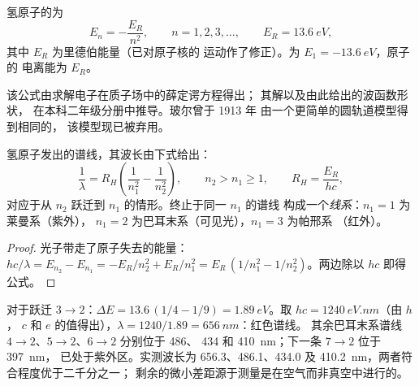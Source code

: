 \begin{theorem}[氢原子的能级]\label{thm:b1:quantum-numbers:levels}
氢原子的为
\[
  E_n = -\frac{E_R}{n^2}, \qquad n = 1, 2, 3, \dots,
  \qquad E_R = \qty{13.6}{eV},
\]
其中 $E_R$ 为里德伯能量（已对原子核的
运动作了修正）。为 $E_1 = \qty{-13.6}{eV}$，原子的
电离能为 $E_R$。
\end{theorem}
\admitted

\begin{remark}[公式的来源]\label{rem:b1:quantum-numbers:schrodinger}
该公式由求解电子在质子场中的薛定谔方程得出；
其解以及由此给出的波函数形状，
在本科二年级分册中推导。玻尔曾于 1913 年
由一个更简单的圆轨道模型得到相同的，
该模型现已被弃用。
\end{remark}

\begin{proposition}[里德伯公式]\label{prop:b1:quantum-numbers:rydberg}
氢原子发出的谱线，其波长由下式给出：
\[
  \frac{1}{\lambda} = R_H\left(\frac{1}{n_1^2} - \frac{1}{n_2^2}\right),
  \qquad n_2 > n_1 \ge 1, \qquad R_H = \frac{E_R}{hc},
\]
对应于从 $n_2$ 跃迁到 $n_1$ 的情形。终止于同一 $n_1$ 的谱线
构成一个\emph{线系}：$n_1 = 1$ 为莱曼系（紫外），
$n_1 = 2$ 为巴耳末系（可见光），$n_1 = 3$ 为帕邢系
（红外）。
\end{proposition}

\begin{proof}
光子带走了原子失去的能量：
$hc/\lambda = E_{n_2} - E_{n_1} = -E_R/n_2^2 + E_R/n_1^2
= E_R\,(1/n_1^2 - 1/n_2^2)$。两边除以 $hc$ 即得公式。
\end{proof}

\begin{example}[氢的红色谱线]\label{ex:b1:quantum-numbers:halpha}
对于跃迁 $3 \to 2$：$\Delta E = 13.6\,(1/4 - 1/9) =
\qty{1.89}{eV}$。取 $hc = \qty{1240}{eV.nm}$（由 $h$，
$c$ 和 $e$ 的值得出），$\lambda = 1240/1.89 = \qty{656}{nm}$：红色谱线。
其余巴耳末系谱线 $4 \to 2$、$5 \to 2$、$6 \to 2$ 分别位于 486、
434 和 \qty{410}{nm}；下一条 $7 \to 2$ 位于 \qty{397}{nm}，
已处于紫外区。实测波长为 656.3、486.1、434.0
及 \qty{410.2}{nm}，两者符合程度优于二千分之一；
剩余的微小差距源于测量是在空气而非真空中进行的。
\end{example}

